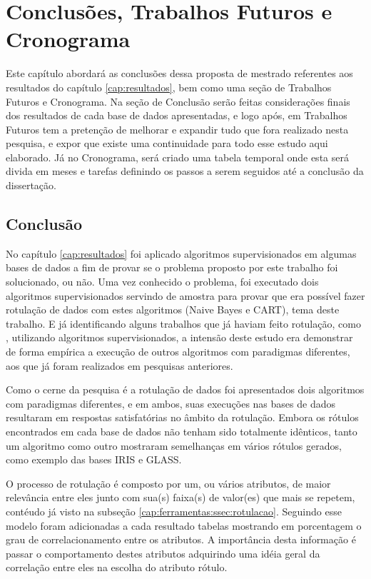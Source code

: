 \chapter{Conclusões, Trabalhos Futuros e Cronograma}\label{cap:conclusao} 

Este capítulo abordará as conclusões dessa  proposta de mestrado referentes aos resultados do capítulo \ref{cap:resultados},  bem como uma seção de Trabalhos Futuros e  Cronograma. Na seção de Conclusão serão feitas considerações finais dos resultados de cada base de dados apresentadas, e logo após, em Trabalhos Futuros tem a pretenção de melhorar e expandir tudo que fora realizado  nesta pesquisa, e expor que existe uma continuidade para todo esse estudo aqui elaborado. Já no Cronograma, será criado uma tabela temporal onde esta será divida em meses e tarefas definindo os passos a serem seguidos até a conclusão da dissertação.

\section{Conclusão}\label{cond}
No capítulo \ref{cap:resultados} foi aplicado algoritmos supervisionados em algumas bases de dados a fim de provar se o problema proposto por este  trabalho foi solucionado, ou não. Uma vez conhecido o problema, foi executado dois algoritmos supervisionados servindo de amostra para provar que era possível fazer rotulação de dados com estes algoritmos (Naive Bayes e CART), tema deste trabalho. E já identificando alguns trabalhos que já haviam feito rotulação, como , utilizando algoritmos supervisionados, a intensão deste estudo era demonstrar de forma empírica a execução de outros algoritmos com paradigmas diferentes, aos que já foram realizados em pesquisas anteriores. 

Como o cerne da pesquisa é a rotulação de dados foi apresentados dois algoritmos com paradigmas diferentes, e em ambos, suas execuções nas bases de dados resultaram em respostas satisfatórias no âmbito da rotulação. Embora os rótulos encontrados  em cada base de dados não tenham sido totalmente idênticos, tanto um algoritmo como outro mostraram semelhanças em vários rótulos gerados, como exemplo das bases IRIS e GLASS.

O processo de rotulação é composto por um, ou vários atributos, de maior relevância entre eles junto com sua(s) faixa(s) de valor(es) que mais se repetem, contéudo já visto na subseção \ref{cap:ferramentas:ssec:rotulacao}. Seguindo esse modelo foram adicionadas a cada resultado tabelas mostrando em porcentagem o grau de correlacionamento entre os atributos. A importância desta informação é passar o comportamento destes atributos adquirindo uma idéia geral da correlação entre eles na escolha do atributo rótulo.


